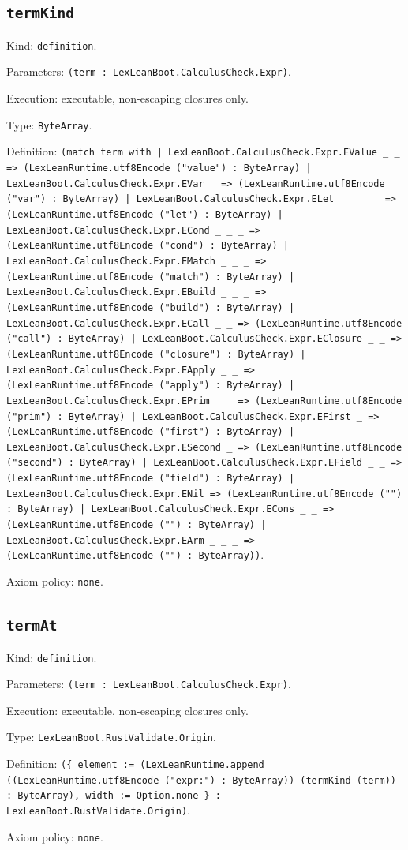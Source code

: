 \documentclass[11pt]{article}
\begin{document}
\subsection*{\texttt{termKind}}
\noindent Kind: \texttt{definition}.\par
\noindent Parameters: \texttt{(term : LexLeanBoot.CalculusCheck.Expr)}.\par
\noindent Execution: executable, non-escaping closures only.\par
\noindent Type: \texttt{ByteArray}.\par
\noindent Definition: \texttt{(match term with | LexLeanBoot.CalculusCheck.Expr.EValue \_ \_ => (LexLeanRuntime.utf8Encode ("value") : ByteArray) | LexLeanBoot.CalculusCheck.Expr.EVar \_ => (LexLeanRuntime.utf8Encode ("var") : ByteArray) | LexLeanBoot.CalculusCheck.Expr.ELet \_ \_ \_ \_ => (LexLeanRuntime.utf8Encode ("let") : ByteArray) | LexLeanBoot.CalculusCheck.Expr.ECond \_ \_ \_ => (LexLeanRuntime.utf8Encode ("cond") : ByteArray) | LexLeanBoot.CalculusCheck.Expr.EMatch \_ \_ \_ => (LexLeanRuntime.utf8Encode ("match") : ByteArray) | LexLeanBoot.CalculusCheck.Expr.EBuild \_ \_ \_ => (LexLeanRuntime.utf8Encode ("build") : ByteArray) | LexLeanBoot.CalculusCheck.Expr.ECall \_ \_ => (LexLeanRuntime.utf8Encode ("call") : ByteArray) | LexLeanBoot.CalculusCheck.Expr.EClosure \_ \_ => (LexLeanRuntime.utf8Encode ("closure") : ByteArray) | LexLeanBoot.CalculusCheck.Expr.EApply \_ \_ => (LexLeanRuntime.utf8Encode ("apply") : ByteArray) | LexLeanBoot.CalculusCheck.Expr.EPrim \_ \_ => (LexLeanRuntime.utf8Encode ("prim") : ByteArray) | LexLeanBoot.CalculusCheck.Expr.EFirst \_ => (LexLeanRuntime.utf8Encode ("first") : ByteArray) | LexLeanBoot.CalculusCheck.Expr.ESecond \_ => (LexLeanRuntime.utf8Encode ("second") : ByteArray) | LexLeanBoot.CalculusCheck.Expr.EField \_ \_ => (LexLeanRuntime.utf8Encode ("field") : ByteArray) | LexLeanBoot.CalculusCheck.Expr.ENil => (LexLeanRuntime.utf8Encode ("") : ByteArray) | LexLeanBoot.CalculusCheck.Expr.ECons \_ \_ => (LexLeanRuntime.utf8Encode ("") : ByteArray) | LexLeanBoot.CalculusCheck.Expr.EArm \_ \_ \_ => (LexLeanRuntime.utf8Encode ("") : ByteArray))}.\par
\noindent Axiom policy: \texttt{none}.\par
\subsection*{\texttt{termAt}}
\noindent Kind: \texttt{definition}.\par
\noindent Parameters: \texttt{(term : LexLeanBoot.CalculusCheck.Expr)}.\par
\noindent Execution: executable, non-escaping closures only.\par
\noindent Type: \texttt{LexLeanBoot.RustValidate.Origin}.\par
\noindent Definition: \texttt{(\{ element := (LexLeanRuntime.append ((LexLeanRuntime.utf8Encode ("expr:") : ByteArray)) (termKind (term)) : ByteArray), width := Option.none \} : LexLeanBoot.RustValidate.Origin)}.\par
\noindent Axiom policy: \texttt{none}.\par
\end{document}
